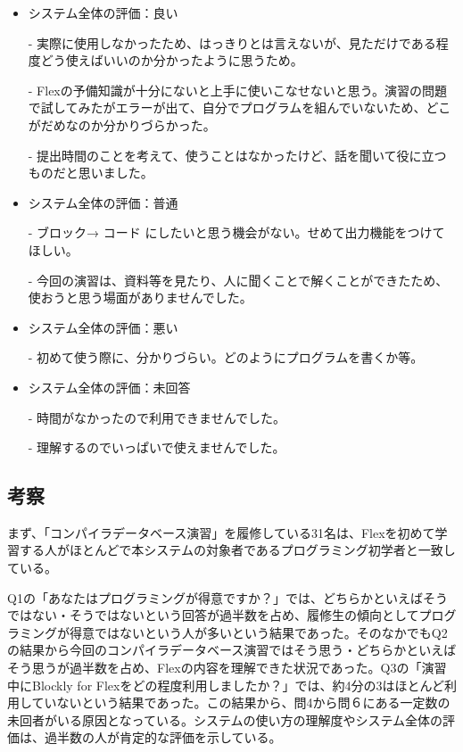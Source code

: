 \documentclass{risepaper}
\begin{document}
\begin{itemize}
\item システム全体の評価：良い

- 実際に使用しなかったため、はっきりとは言えないが、見ただけである程度どう使えばいいのか分かったように思うため。

- Flexの予備知識が十分にないと上手に使いこなせないと思う。演習の問題で試してみたがエラーが出て、自分でプログラムを組んでいないため、どこがだめなのか分かりづらかった。

- 提出時間のことを考えて、使うことはなかったけど、話を聞いて役に立つものだと思いました。

\item システム全体の評価：普通

- ブロック→ コード にしたいと思う機会がない。せめて出力機能をつけてほしい。

- 今回の演習は、資料等を見たり、人に聞くことで解くことができたため、使おうと思う場面がありませんでした。

\item システム全体の評価：悪い

- 初めて使う際に、分かりづらい。どのようにプログラムを書くか等。

\item システム全体の評価：未回答

- 時間がなかったので利用できませんでした。

- 理解するのでいっぱいで使えませんでした。

\end{itemize} 

        \subsection{考察}

まず、「コンパイラデータベース演習」を履修している31名は、Flexを初めて学習する人がほとんどで本システムの対象者であるプログラミング初学者と一致している。


Q1の「あなたはプログラミングが得意ですか？」では、どちらかといえばそうではない・そうではないという回答が過半数を占め、履修生の傾向としてプログラミングが得意ではないという人が多いという結果であった。そのなかでもQ2の結果から今回のコンパイラデータベース演習ではそう思う・どちらかといえばそう思うが過半数を占め、Flexの内容を理解できた状況であった。Q3の「演習中にBlockly for Flexをどの程度利用しましたか？」では、約4分の3はほとんど利用していないという結果であった。この結果から、問4から問６にある一定数の未回者がいる原因となっている。システムの使い方の理解度やシステム全体の評価は、過半数の人が肯定的な評価を示している。
\end{document}
